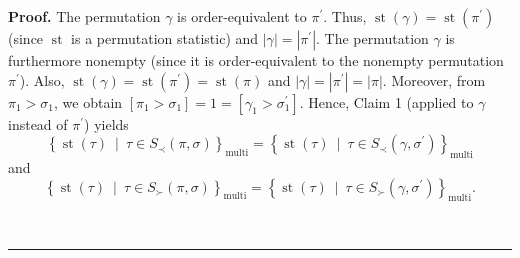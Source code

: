 \documentclass[numbers=enddot,12pt,final,onecolumn,notitlepage]{scrartcl}%
\theoremstyle{definition}
\newenvironment{proof}[1][Proof]{\noindent\textbf{#1.} }{\ \rule{0.5em}{0.5em}}
\begin{document}
\begin{proof}
The permutation $\gamma$ is order-equivalent to $\pi^{\prime}$. Thus,
$\operatorname*{st}\left(  \gamma\right)  =\operatorname*{st}\left(
\pi^{\prime}\right)  $ (since $\operatorname*{st}$ is a permutation statistic)
and $\left\vert \gamma\right\vert =\left\vert \pi^{\prime}\right\vert $. The
permutation $\gamma$ is furthermore nonempty (since it is order-equivalent to
the nonempty permutation $\pi^{\prime}$). Also, $\operatorname*{st}\left(
\gamma\right)  =\operatorname*{st}\left(  \pi^{\prime}\right)
=\operatorname*{st}\left(  \pi\right)  $ and $\left\vert \gamma\right\vert
=\left\vert \pi^{\prime}\right\vert =\left\vert \pi\right\vert $. Moreover,
from $\pi_{1}>\sigma_{1}$, we obtain $\left[  \pi_{1}>\sigma_{1}\right]
=1=\left[  \gamma_{1}>\sigma_{1}^{\prime}\right]  $. Hence, Claim 1 (applied
to $\gamma$ instead of $\pi^{\prime}$) yields
\begin{equation}
\left\{  \operatorname*{st}\left(  \tau\right)  \ \mid\ \tau\in S_{\prec
}\left(  \pi,\sigma\right)  \right\}  _{\operatorname*{multi}}=\left\{
\operatorname*{st}\left(  \tau\right)  \ \mid\ \tau\in S_{\prec}\left(
\gamma,\sigma^{\prime}\right)  \right\}  _{\operatorname*{multi}}
\label{pf.lem.LRcomp.head-l2.c4.pf.5}%
\end{equation}
and%
\begin{equation}
\left\{  \operatorname*{st}\left(  \tau\right)  \ \mid\ \tau\in S_{\succ
}\left(  \pi,\sigma\right)  \right\}  _{\operatorname*{multi}}=\left\{
\operatorname*{st}\left(  \tau\right)  \ \mid\ \tau\in S_{\succ}\left(
\gamma,\sigma^{\prime}\right)  \right\}  _{\operatorname*{multi}}.
\label{pf.lem.LRcomp.head-l2.c4.pf.6}%
\end{equation}



\end{proof}
\end{document}
